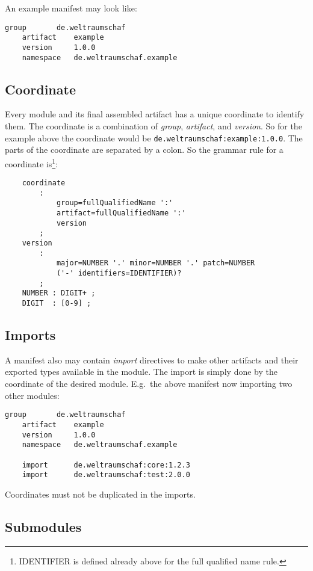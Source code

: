 \documentclass[11pt,a4paper]{report}
\begin{document}
An example manifest may look like:

\begin{lstlisting}[language=CayThe]
    group       de.weltraumschaf
    artifact    example
    version     1.0.0
    namespace   de.weltraumschaf.example
\end{lstlisting}

\subsection{Coordinate}

Every module and its final assembled artifact has a unique coordinate to identify them. The coordinate is a combination of \textit{group}, \textit{artifact}, and \textit{version}. So for the example above the coordinate would be \texttt{de.weltraumschaf:example:1.0.0}. The parts of the coordinate are separated by a colon. So the grammar rule for a coordinate is\footnote{IDENTIFIER is defined already above for the full qualified name rule.}:

\begin{lstlisting}
    coordinate
        :
            group=fullQualifiedName ':'
            artifact=fullQualifiedName ':'
            version
        ;
    version
        : 
            major=NUMBER '.' minor=NUMBER '.' patch=NUMBER
            ('-' identifiers=IDENTIFIER)?
        ;
    NUMBER : DIGIT+ ;
    DIGIT  : [0-9] ;
\end{lstlisting}

\subsection{Imports}

A manifest also may contain \textit{import} directives to make other artifacts and their exported types available in the module. The import is simply done by the coordinate of the desired module. E.g.\ the above manifest now importing two other modules:

\begin{lstlisting}[language=CayThe]
    group       de.weltraumschaf
    artifact    example
    version     1.0.0
    namespace   de.weltraumschaf.example

    import      de.weltraumschaf:core:1.2.3
    import      de.weltraumschaf:test:2.0.0
\end{lstlisting}

Coordinates must not be duplicated in the imports.

\subsection{Submodules}
\end{document}
